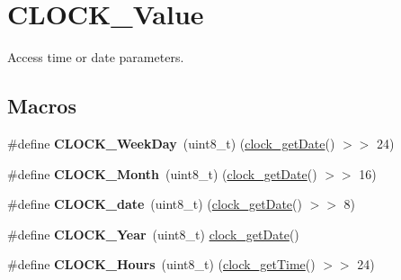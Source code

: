 \hypertarget{group___c_l_o_c_k___value}{}\section{C\+L\+O\+C\+K\+\_\+\+Value}
\label{group___c_l_o_c_k___value}


Access time or date parameters.  


\subsection*{Macros}
\begin{DoxyCompactItemize}
\item 
\mbox{\label{group___c_l_o_c_k___value_ga41cab09c59fe3cc9a25719ec3be3fd4d}} 
\#define {\bfseries C\+L\+O\+C\+K\+\_\+\+Week\+Day}~(uint8\+\_\+t) (\hyperlink{group___time___date_gabb4d72928cb3d131d40067fb141003aa}{clock\+\_\+get\+Date}() $>$$>$ 24)
\item 
\mbox{\label{group___c_l_o_c_k___value_gabd717170aa836b16355413e2c5ca0ad8}} 
\#define {\bfseries C\+L\+O\+C\+K\+\_\+\+Month}~(uint8\+\_\+t) (\hyperlink{group___time___date_gabb4d72928cb3d131d40067fb141003aa}{clock\+\_\+get\+Date}() $>$$>$ 16)
\item 
\mbox{\label{group___c_l_o_c_k___value_gaad5816af032bcc19c84bc93e03f42236}} 
\#define {\bfseries C\+L\+O\+C\+K\+\_\+date}~(uint8\+\_\+t) (\hyperlink{group___time___date_gabb4d72928cb3d131d40067fb141003aa}{clock\+\_\+get\+Date}() $>$$>$ 8)
\item 
\mbox{\label{group___c_l_o_c_k___value_ga35866274a21e8d3c0223c465209f3d74}} 
\#define {\bfseries C\+L\+O\+C\+K\+\_\+\+Year}~(uint8\+\_\+t) \hyperlink{group___time___date_gabb4d72928cb3d131d40067fb141003aa}{clock\+\_\+get\+Date}()
\item 
\mbox{\label{group___c_l_o_c_k___value_ga49ea807900604714bab70a531081ac6a}} 
\#define {\bfseries C\+L\+O\+C\+K\+\_\+\+Hours}~(uint8\+\_\+t) (\hyperlink{group___time___date_ga03ae6948083c259f6edc0b146f40dc62}{clock\+\_\+get\+Time}() $>$$>$ 24)
\item 
\mbox{\label{group___c_l_o_c_k___value_ga302d9ee9e79c96969e558b9ffdba3212}} 

\end{DoxyCompactItemize}
